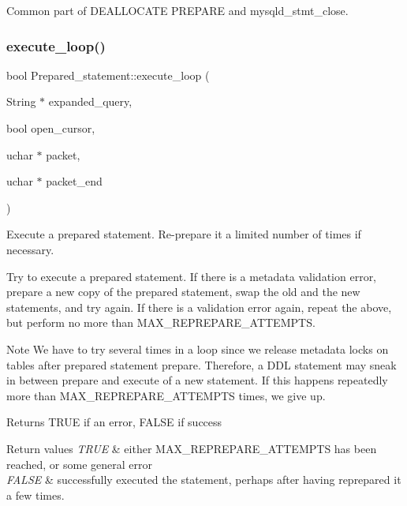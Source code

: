 Common part of D\+E\+A\+L\+L\+O\+C\+A\+TE P\+R\+E\+P\+A\+RE and mysqld\+\_\+stmt\+\_\+close. \mbox{\label{classPrepared__statement_a242307a08c73c7f6ea9778d8f9af719b}} 
\subsubsection{\texorpdfstring{execute\+\_\+loop()}{execute\_loop()}}
{\footnotesize\ttfamily bool Prepared\+\_\+statement\+::execute\+\_\+loop (\begin{DoxyParamCaption}\item[{String $\ast$}]{expanded\+\_\+query,  }\item[{bool}]{open\+\_\+cursor,  }\item[{uchar $\ast$}]{packet,  }\item[{uchar $\ast$}]{packet\+\_\+end }\end{DoxyParamCaption})}

Execute a prepared statement. Re-\/prepare it a limited number of times if necessary.

Try to execute a prepared statement. If there is a metadata validation error, prepare a new copy of the prepared statement, swap the old and the new statements, and try again. If there is a validation error again, repeat the above, but perform no more than M\+A\+X\+\_\+\+R\+E\+P\+R\+E\+P\+A\+R\+E\+\_\+\+A\+T\+T\+E\+M\+P\+TS.

\begin{DoxyNote}{Note}
We have to try several times in a loop since we release metadata locks on tables after prepared statement prepare. Therefore, a D\+DL statement may sneak in between prepare and execute of a new statement. If this happens repeatedly more than M\+A\+X\+\_\+\+R\+E\+P\+R\+E\+P\+A\+R\+E\+\_\+\+A\+T\+T\+E\+M\+P\+TS times, we give up.
\end{DoxyNote}
\begin{DoxyReturn}{Returns}
T\+R\+UE if an error, F\+A\+L\+SE if success 
\end{DoxyReturn}

\begin{DoxyRetVals}{Return values}
{\em T\+R\+UE} & either M\+A\+X\+\_\+\+R\+E\+P\+R\+E\+P\+A\+R\+E\+\_\+\+A\+T\+T\+E\+M\+P\+TS has been reached, or some general error \\
\hline
{\em F\+A\+L\+SE} & successfully executed the statement, perhaps after having reprepared it a few times. \\
\hline
\end{DoxyRetVals}
\mbox{\label{classPrepared__statement_a7f79adbd42eb5d502f5d248d17de5b3c}} 
